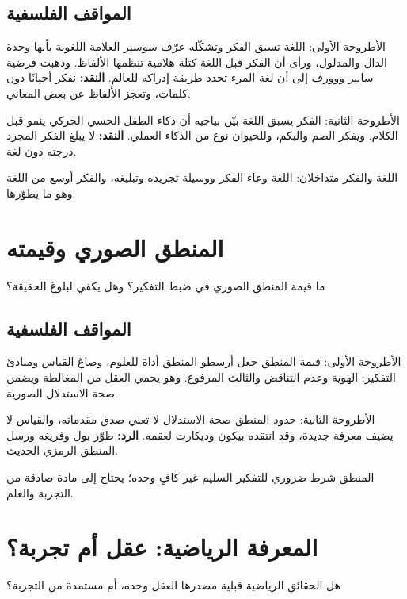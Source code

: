 \documentclass[12pt, twoside, openright]{book}
\begin{document}
\subsection*{المواقف الفلسفية}
\begin{positionbox}{الأطروحة الأولى: اللغة تسبق الفكر وتشكّله}
عرّف سوسير العلامة اللغوية بأنها وحدة الدال والمدلول، ورأى أن الفكر قبل اللغة كتلة هلامية تنظمها الألفاظ. وذهبت فرضية سابير ووورف إلى أن لغة المرء تحدد طريقة إدراكه للعالم. \textbf{النقد:} نفكر أحيانًا دون كلمات، وتعجز الألفاظ عن بعض المعاني.
\end{positionbox}
\begin{positionbox}{الأطروحة الثانية: الفكر يسبق اللغة}
بيّن بياجيه أن ذكاء الطفل الحسي الحركي ينمو قبل الكلام. ويفكر الصم والبكم، وللحيوان نوع من الذكاء العملي. \textbf{النقد:} لا يبلغ الفكر المجرد درجته دون لغة.
\end{positionbox}
\begin{synthbox}
اللغة والفكر متداخلان: اللغة وعاء الفكر ووسيلة تجريده وتبليغه، والفكر أوسع من اللغة وهو ما يطوّرها.
\end{synthbox}

\section{المنطق الصوري وقيمته}
\begin{problembox}
ما قيمة المنطق الصوري في ضبط التفكير؟ وهل يكفي لبلوغ الحقيقة؟
\end{problembox}
\subsection*{المواقف الفلسفية}
\begin{positionbox}{الأطروحة الأولى: قيمة المنطق}
جعل أرسطو المنطق أداة للعلوم، وصاغ القياس ومبادئ التفكير: الهوية وعدم التناقض والثالث المرفوع. وهو يحمي العقل من المغالطة ويضمن صحة الاستدلال الصورية.
\end{positionbox}
\begin{positionbox}{الأطروحة الثانية: حدود المنطق}
صحة الاستدلال لا تعني صدق مقدماته، والقياس لا يضيف معرفة جديدة، وقد انتقده بيكون وديكارت لعقمه. \textbf{الرد:} طوّر بول وفريغه ورسل المنطق الرمزي الحديث.
\end{positionbox}
\begin{synthbox}
المنطق شرط ضروري للتفكير السليم غير كافٍ وحده؛ يحتاج إلى مادة صادقة من التجربة والعلم.
\end{synthbox}

\section{المعرفة الرياضية: عقل أم تجربة؟}
\begin{problembox}
هل الحقائق الرياضية قبلية مصدرها العقل وحده، أم مستمدة من التجربة؟
\end{problembox}
\end{document}
